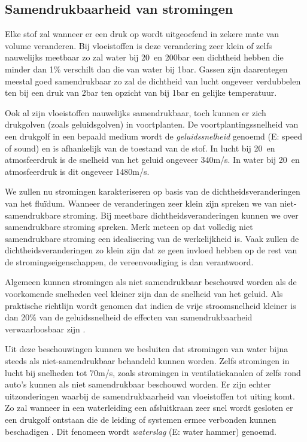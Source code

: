 		\subsection{Samendrukbaarheid van stromingen}
Elke stof zal wanneer er een druk op wordt uitgeoefend in zekere mate van volume veranderen. Bij vloeistoffen is deze verandering zeer klein of zelfs nauwelijks meetbaar zo zal water bij 20\degC\ en 200bar een dichtheid hebben die minder dan 1\% verschilt dan die van water bij 1bar. Gassen zijn daarentegen meestal goed samendrukbaar zo zal de dichtheid van lucht ongeveer verdubbelen ten bij een druk van 2bar ten opzicht van bij 1bar en gelijke temperatuur.

Ook al zijn vloeistoffen nauwelijks samendrukbaar, toch kunnen er zich drukgolven (zoals geluidsgolven) in voortplanten. De voortplantingssnelheid van een drukgolf in een bepaald medium wordt de \emph{geluidssnelheid} genoemd (E: speed of sound) en is afhankelijk van de toestand van de stof. In lucht bij 20\degC\ en atmosfeerdruk is de snelheid van het geluid ongeveer 340m/s. In water bij 20\degC\ en atmosfeerdruk  is dit ongeveer 1480m/s.

We zullen nu stromingen karakteriseren op basis van de dichtheidsveranderingen van het fluïdum. Wanneer de veranderingen zeer klein zijn spreken we van niet-samendrukbare stroming. Bij meetbare dichtheidsveranderingen kunnen we over samendrukbare stroming spreken. Merk meteen op dat volledig niet samendrukbare stroming een idealisering van de werkelijkheid is. Vaak zullen de dichtheidsveranderingen zo klein zijn dat ze geen invloed hebben op de rest van de stromingseigenschappen, de vereenvoudiging is dan verantwoord.

Algemeen kunnen stromingen als niet samendrukbaar beschouwd worden als de voorkomende snelheden veel kleiner zijn dan de snelheid van het geluid. Als praktische richtlijn wordt genomen dat indien de vrije stroomsnelheid kleiner is dan 20\% van de geluidssnelheid de effecten van samendrukbaarheid verwaarloosbaar zijn \cite{Durst2008}.

Uit deze beschouwingen kunnen we besluiten dat stromingen van water bijna steeds als niet-samendrukbaar behandeld kunnen worden. Zelfs stromingen in lucht bij snelheden tot 70m/s, zoals stromingen in ventilatiekanalen of zelfs rond auto's kunnen als niet samendrukbaar beschouwd worden. Er zijn echter uitzonderingen waarbij de samendrukbaarheid van vloeistoffen tot uiting komt. Zo zal wanneer in een waterleiding een afsluitkraan zeer snel wordt gesloten er een drukgolf ontstaan die de leiding of systemen ermee verbonden kunnen beschadigen \cite{Ghidaoui2005}. Dit fenomeen wordt \emph{waterslag} (E: water hammer) genoemd.

